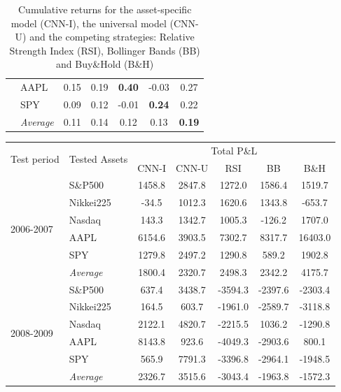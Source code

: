 \documentclass[12pt, a4paper]{article}
\begin{document}
\begin{table}[H]
\begin{tabular}{l|l|ccccc}
  & AAPL             & 0.15              & 0.19          & \textbf{0.40} & -0.03         & 0.27          \\
  & SPY              & 0.09              & 0.12          & -0.01         & \textbf{0.24} & 0.22          \\ \cline{2-7}
  & \textit{Average} & 0.11              & 0.14          & 0.12          & 0.13          & \textbf{0.19}
\end{tabular}
\caption{Cumulative returns for the asset-specific model (CNN-I), the universal model (CNN-U) and the competing strategies: Relative Strength Index (RSI), Bollinger Bands (BB) and Buy\&Hold (B\&H)}
\label{tbl:Cummulative}
\end{table}

\begin{table}[H]
\centering
\begin{tabular}{l|l|ccccc}
        \multicolumn{1}{m{1cm}|}{\multirow{2}{1cm}{Test period}} & \multicolumn{1}{m{1.5cm}|}{\multirow{2}{1.5cm}{Tested Assets}} &       \multicolumn{5}{c}{Total P\&L}  \\ \cline{3-7}
          &           & CNN-I   & CNN-U   & RSI     & BB      & B\&H    \\
          \hline \hline
\multirow{6}{1cm}{2006-2007} & S\&P500   & 1458.8  & 2847.8  & 1272.0  & 1586.4  & 1519.7    \\
          & Nikkei225 & -34.5   & 1012.3  & 1620.6  & 1343.8  & -653.7   \\
          & Nasdaq    & 143.3   & 1342.7  & 1005.3  & -126.2  & 1707.0 \\
          & AAPL      & 6154.6  & 3903.5  & 7302.7  & 8317.7  & 16403.0  \\
          & SPY       & 1279.8  & 2497.2  & 1290.8  & 589.2   & 1902.8 \\
          \cline{2-7}
          & \textit{Average}   & 1800.4  & 2320.7  & 2498.3  & 2342.2  & 4175.7 \\
          \hline
\multirow{6}{1cm}{2008-2009}& S\&P500   & 637.4  & 3438.7 & -3594.3 & -2397.6 & -2303.4 \\
 & Nikkei225 & 164.5  & 603.7  & -1961.0 & -2589.7 & -3118.8 \\
 & Nasdaq    & 2122.1 & 4820.7 & -2215.5 & 1036.2  & -1290.8 \\
 & AAPL      & 8143.8 & 923.6  & -4049.3 & -2903.6 & 800.1   \\
 & SPY       & 565.9  & 7791.3 & -3396.8 & -2964.1 & -1948.5 \\ \cline{2-7} 
 & \textit{Average} & 2326.7    & 3515.6    & -3043.4    & -1963.8      & -1572.3   \\

\end{tabular}
\end{table}
\end{document}
